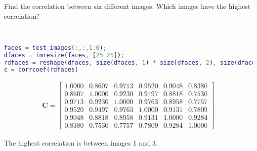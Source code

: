 Find the correlation between six different images. Which images have the highest correlation?

\begin{solution} \
    \begin{lstlisting}[language=Matlab]
faces = test_images(:,:,1:6);
dfaces = imresize(faces, [25 25]);
rdfaces = reshape(dfaces, size(dfaces, 1) * size(dfaces, 2), size(dfaces, 3));
c = corrcoef(rdfaces)
    \end{lstlisting}

    \begin{align*}
        \boldsymbol{C} = \begin{bmatrix}
            1.0000 & 0.8607 & 0.9713 & 0.9520 & 0.9048 & 0.8380 \\
            0.8607 & 1.0000 & 0.9230 & 0.9497 & 0.8818 & 0.7530 \\
            0.9713 & 0.9230 & 1.0000 & 0.9763 & 0.8958 & 0.7757 \\
            0.9520 & 0.9497 & 0.9763 & 1.0000 & 0.9131 & 0.7809 \\
            0.9048 & 0.8818 & 0.8958 & 0.9131 & 1.0000 & 0.9284 \\
            0.8380 & 0.7530 & 0.7757 & 0.7809 & 0.9284 & 1.0000
        \end{bmatrix}
    \end{align*}
    
    The highest correlation is between images 1 and 3.
\end{solution}